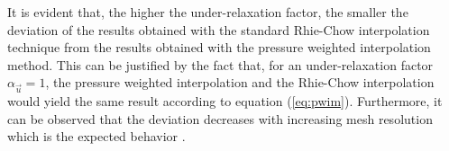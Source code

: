 It is evident that, the higher the under-relaxation factor, the smaller the deviation of the results obtained with the standard Rhie-Chow interpolation technique from the results obtained with the pressure weighted interpolation method. This can be justified by the fact that, for an under-relaxation factor \(\alpha_\vec{u} = 1\), the pressure weighted interpolation and the Rhie-Chow interpolation would yield the same result according to equation (\ref{eq:pwim}). Furthermore, it can be observed that the deviation decreases with increasing mesh resolution which is the expected behavior \cite{ferziger02}.

